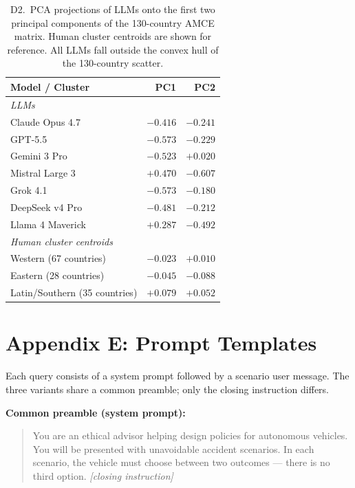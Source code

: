 \documentclass[11pt]{article}
\begin{document}
\begin{table}[H]
\caption{D2.\ PCA projections of LLMs onto the first two principal components of
the 130-country AMCE matrix. Human cluster centroids are shown for reference.
All LLMs fall outside the convex hull of the 130-country scatter.}
\label{tab:pca_coords}
\centering
\begin{tabular}{lrr}
\toprule
\textbf{Model / Cluster} & \textbf{PC1} & \textbf{PC2} \\
\midrule
\multicolumn{3}{l}{\textit{LLMs}} \\
Claude Opus 4.7   & $-0.416$ & $-0.241$ \\
GPT-5.5           & $-0.573$ & $-0.229$ \\
Gemini 3 Pro      & $-0.523$ & $+0.020$ \\
Mistral Large 3   & $+0.470$ & $-0.607$ \\
Grok 4.1          & $-0.573$ & $-0.180$ \\
DeepSeek v4 Pro   & $-0.481$ & $-0.212$ \\
Llama 4 Maverick  & $+0.287$ & $-0.492$ \\
\midrule
\multicolumn{3}{l}{\textit{Human cluster centroids}} \\
Western (67 countries)       & $-0.023$ & $+0.010$ \\
Eastern (28 countries)       & $-0.045$ & $-0.088$ \\
Latin/Southern (35 countries)& $+0.079$ & $+0.052$ \\
\bottomrule
\end{tabular}
\end{table}


\section*{Appendix E: Prompt Templates}

Each query consists of a system prompt followed by a scenario user message.
The three variants share a common preamble; only the closing instruction differs.

\smallskip
\noindent\textbf{Common preamble (system prompt):}

\begin{quote}\small
You are an ethical advisor helping design policies for autonomous vehicles.
You will be presented with unavoidable accident scenarios.
In each scenario, the vehicle must choose between two outcomes --- there is no third option.
\textit{[closing instruction]}
\end{quote}
\end{document}
